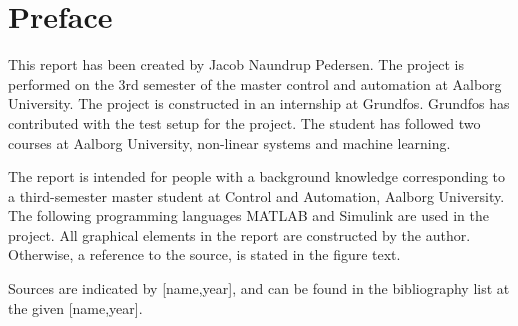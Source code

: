 \chapter*{Preface}
This report has been created by Jacob Naundrup Pedersen. The project is performed on the 3rd semester of the master control and automation at Aalborg University. The project is constructed in an internship at Grundfos. Grundfos has contributed with the test setup for the project. The student has followed two courses at Aalborg University, non-linear systems and machine learning. 

The report is intended for people with a background knowledge corresponding to a third-semester master student at Control and Automation, Aalborg University. The following programming languages MATLAB and Simulink are used in the project. All graphical elements in the report are constructed by the author. Otherwise, a reference to the source, is stated in the figure text.

Sources are indicated by [name,year], and can be found in the bibliography list at the given [name,year].



 
